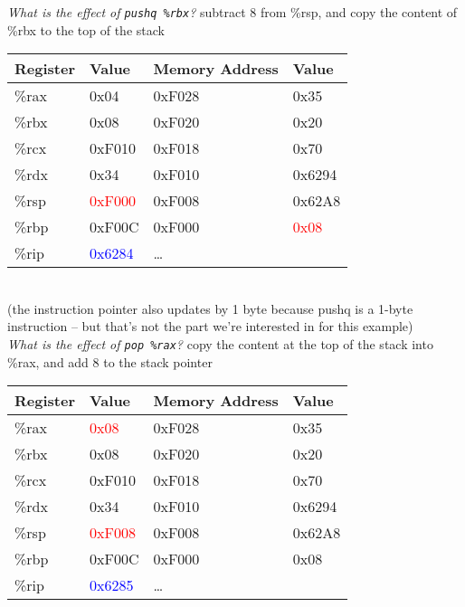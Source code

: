 \documentclass{article}
\begin{document}
\textit{What is the effect of \texttt{pushq \%rbx}?} subtract 8 from \%rsp, and copy the content of \%rbx to the top of the stack \\
\begin{tabular}{|l|l||l|l|} \hline
Register & Value & Memory Address & Value \\ \hline
\%rax & 0x04   & 0xF028 & 0x35   \\ \hline
\%rbx & 0x08   & 0xF020 & 0x20   \\ \hline
\%rcx & 0xF010 & 0xF018 & 0x70   \\ \hline
\%rdx & 0x34   & 0xF010 & 0x6294 \\ \hline
\%rsp & \textcolor{red}{0xF000} & 0xF008 & 0x62A8 \\ \hline
\%rbp & 0xF00C & 0xF000 & \textcolor{red}{0x08}   \\ \hline
\%rip & \textcolor{blue}{0x6284} & \dots  &        \\ \hline
\end{tabular} \\
(the instruction pointer also updates by 1 byte because pushq is a 1-byte instruction -- but that's not the part we're interested in for this example) \\

\textit{What is the effect of \texttt{pop \%rax}?} copy the content at the top of the stack into \%rax, and add 8 to the stack pointer \\
\begin{tabular}{|l|l||l|l|} \hline
Register & Value & Memory Address & Value \\ \hline
\%rax & \textcolor{red}{0x08}   & 0xF028 & 0x35   \\ \hline
\%rbx & 0x08   & 0xF020 & 0x20   \\ \hline
\%rcx & 0xF010 & 0xF018 & 0x70   \\ \hline
\%rdx & 0x34   & 0xF010 & 0x6294 \\ \hline
\%rsp & \textcolor{red}{0xF008} & 0xF008 & 0x62A8 \\ \hline
\%rbp & 0xF00C & 0xF000 & 0x08   \\ \hline
\%rip & \textcolor{blue}{0x6285} & \dots  &        \\ \hline
\end{tabular} \\
\end{document}
